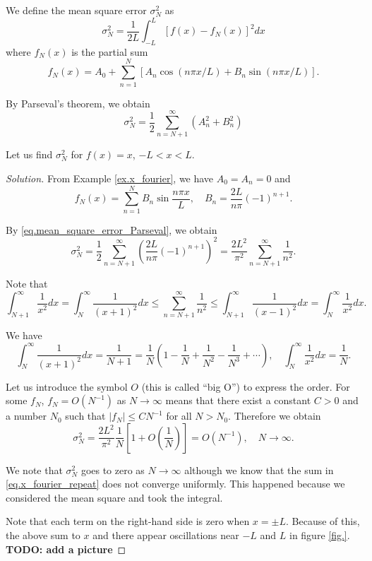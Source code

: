 We define the mean square error $\sigma_N^2$ as
\begin{equation}\label{eq.mean_square_error}
    \sigma_N^2=\frac{1}{2 L} \int_{-L}^L\left[f(x)-f_N(x)\right]^2 d x
\end{equation}
where $f_N(x)$ is the partial sum
\begin{equation}
    f_N(x)=A_0+\sum_{n=1}^N\left[A_n \cos (n \pi x / L)+B_n \sin (n \pi x / L)\right] .
\end{equation}

By Parseval's theorem, we obtain
\begin{equation}\label{eq.mean_square_error_Parseval}
    \sigma_N^2=\frac{1}{2} \sum_{n=N+1}^{\infty}\left(A_n^2+B_n^2\right)
\end{equation}

\begin{example}[]
Let us find $\sigma_N^2$ for $f(x)=x$, $-L<x<L$. 
\end{example}
\begin{proof}[Solution]
From Example \ref{ex.x_fourier}, we have $A_0=A_n=0$ and
\begin{equation}\label{eq.x_fourier_repeat}
    f_N(x)=\sum_{n=1}^N B_n \sin \frac{n \pi x}{L}, \quad B_n=\frac{2 L}{n \pi}(-1)^{n+1} .
\end{equation}

By \eqref{eq.mean_square_error_Parseval}, we obtain
$$
\sigma_N^2=\frac{1}{2} \sum_{n=N+1}^{\infty}\left(\frac{2 L}{n \pi}(-1)^{n+1}\right)^2=\frac{2 L^2}{\pi^2} \sum_{n=N+1}^{\infty} \frac{1}{n^2} .
$$

Note that
$$
\int_{N+1}^{\infty} \frac{1}{x^2} d x=\int_N^{\infty} \frac{1}{(x+1)^2} d x \leq \sum_{n=N+1}^{\infty} \frac{1}{n^2} \leq \int_{N+1}^{\infty} \frac{1}{(x-1)^2} d x=\int_N^{\infty} \frac{1}{x^2} d x .
$$

We have
$$
\int_N^{\infty} \frac{1}{(x+1)^2} d x=\frac{1}{N+1}=\frac{1}{N}\left(1-\frac{1}{N}+\frac{1}{N^2}-\frac{1}{N^3}+\cdots\right), \quad \int_N^{\infty} \frac{1}{x^2} d x=\frac{1}{N} .
$$

Let us introduce the symbol $O$ (this is called ``big O'') to express the order. For some $f_N$, $f_N=O\left(N^{-1}\right)$ as $N \rightarrow \infty$ means that there exist a constant $C>0$ and a number $N_0$ such that $\left|f_N\right| \leq C N^{-1}$ for all $N>N_0$. Therefore we obtain
\begin{equation}\label{eq.x_fourier_mse_converge}
    \sigma_N^2=\frac{2 L^2}{\pi^2} \frac{1}{N}\left[1+O\left(\frac{1}{N}\right)\right]=O\left(N^{-1}\right), \quad N \rightarrow \infty .
\end{equation}

We note that $\sigma_N^2$ goes to zero as $N \rightarrow \infty$ although we know that the sum in \eqref{eq.x_fourier_repeat} does not converge uniformly. This happened because we considered the mean square and took the integral.

Note that each term on the right-hand side is zero when $x= \pm L$. Because of this, the above sum to $x$ and there appear oscillations near $-L$ and $L$ in figure \ref{fig.}. \textbf{TODO: add a picture}
\end{proof}

